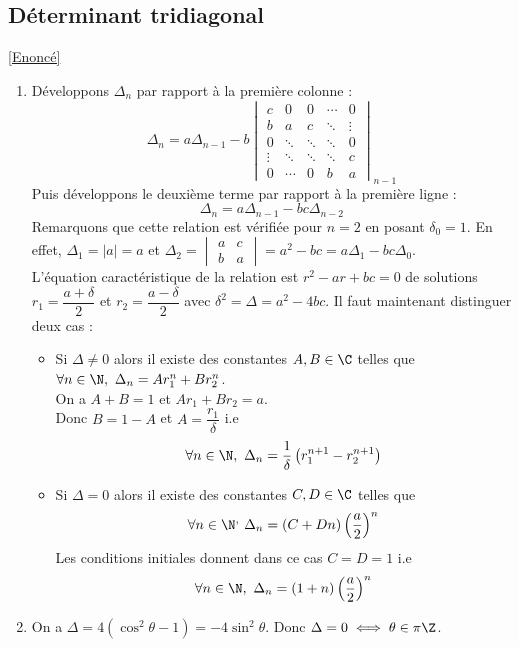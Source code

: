 \documentclass[8pt]{book}
\begin{document}
	\subsection{Déterminant tridiagonal}
	\label{Déterminant tridiagonal corrigé}
	\textcolor{blue}{\hyperref[Déterminant tridiagonal]{[Enoncé]}}\\
	\begin{enumerate}[leftmargin=*]
		\item Développons $\Delta_n$ par rapport à la première colonne :
		$$\Delta_n=a\Delta_{n-1}-b\begin{vmatrix}
			c&0&0&\cdots&0\\
			b&a&c&\ddots&\vdots\\
			0&\ddots&\ddots&\ddots&0\\
			\vdots&\ddots&\ddots&\ddots&c\\
			0&\cdots&0&b&a
		\end{vmatrix}_{n-1}$$
		Puis développons le deuxième terme par rapport à la première ligne :
		$$\Delta_n=a\Delta_{n-1}-bc\Delta_{n-2}$$
		Remarquons que cette relation est vérifiée pour $n=2$ en posant $\delta_0=1$. En effet, $\Delta_1=|a|=a$ et $\Delta_2=\begin{vmatrix}
			a&c\\
			b&a
		\end{vmatrix}=a^2-bc=a\Delta_1-bc\Delta_0$.\\
		L'équation caractéristique de la relation est $r^2-ar+bc=0$ de solutions $r_1=\dfrac{a+\delta}{2}$ et $r_2=\dfrac{a-\delta}{2}$ avec $\delta^2=\Delta=a^2-4bc$. Il faut maintenant distinguer deux cas :
		\begin{itemize}
			\item Si $\Delta\ne 0$ alors il existe des constantes $A,B\in \C$ telles que $\forall n\in \N,\ \Delta_n=Ar_1^n+Br_2^n$.\\
			On a $A+B=1$ et $Ar_1+Br_2=a$.\\
			Donc $B=1-A$ et $A=\dfrac{r_1}{\delta}$ i.e
			$$\forall n\in \N,\ \Delta_n=\dfrac{1}{\delta}\left(r_1^{n+1}-r_2^{n+1}\right)$$
			\item Si $\Delta=0$ alors il existe des constantes $C,D\in \C$ telles que $$\forall n\in \N^,\ \Delta_n=(C+Dn)\left(\dfrac{a}{2}\right)^n$$
			Les conditions initiales donnent dans ce cas $C=D=1$ i.e
			$$\forall n\in \N,\ \Delta_n=(1+n)\left(\dfrac{a}{2}\right)^n$$
		\end{itemize}
		\item On a $\Delta=4(\cos^2\theta-1)=-4\sin^2\theta$. Donc $\Delta=0\iff \theta\in \pi\Z$.

\end{enumerate}
\end{document}
